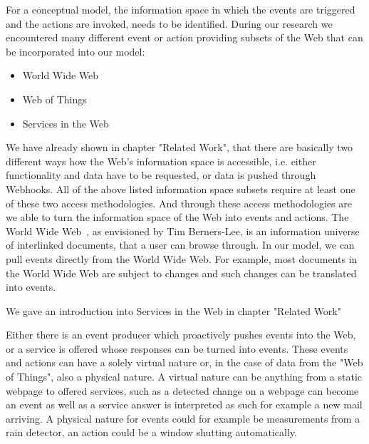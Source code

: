 
For a conceptual model, the information space in which the events are triggered and the actions are invoked, needs to be identified.
During our research we encountered many different event or action providing subsets of the Web that can be incorporated into our model:
\begin{itemize}
  \item \textrm{World Wide Web}
  \item \textrm{Web of Things}
  \item Services in the Web
\end{itemize}
We have already shown in chapter "Related Work", that there are basically two different ways how the Web's information space is accessible, i.e. either functionality and data have to be requested, or data is pushed through Webhooks.
All of the above listed information space subsets require at least one of these two access methodologies.
And through these access methodologies are we able to turn the information space of the Web into events and actions.
The \textrm{World Wide Web}~\cite{DBLP:journals/en/Berners-LeeCGP92}, as envisioned by Tim Berners-Lee, is an information universe of interlinked documents, that a user can browse through.
In our model, we can pull events directly from the World Wide Web.
For example, most documents in the World Wide Web are subject to changes and such changes can be translated into events.

We gave an introduction into \textrm{Services in the Web} in chapter "Related Work"


Either there is an event producer which proactively pushes events into the Web, or a service is offered whose responses can be turned into events.
These events and actions can have a solely virtual nature or, in the case of data from the \textrm{"Web of Things"}, also a physical nature.
A virtual nature can be anything from a static webpage to offered services, such as a detected change on a webpage can become an event as well as a service answer is interpreted as such for example a new mail arriving.
A physical nature for events could for example be measurements from a rain detector, an action could be a window shutting automatically.

